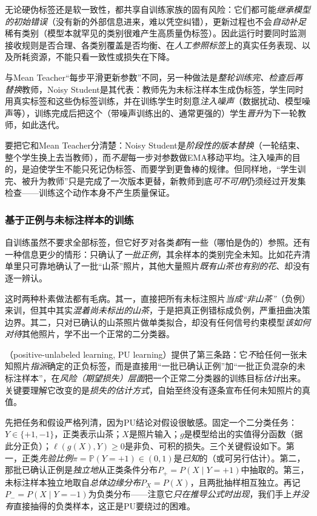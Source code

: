 无论硬伪标签还是软一致性，都共享自训练家族的固有风险：它们都可能\emph{继承模型的初始错误}（没有新的外部信息进来，难以凭空纠错），更新过程也不会\emph{自动补足}稀有类别（模型本就罕见的类别很难产生高质量伪标签）。因此运行时要同时监测接收规则是否合理、各类别覆盖是否均衡、在\emph{人工参照标签}上的真实任务表现、以及所耗资源，不能只看一致性或损失在下降。

与Mean Teacher“每步平滑更新参数”不同，另一种做法是\emph{整轮训练完、检查后再替换}教师，Noisy Student是其代表：教师先为未标注样本生成伪标签，学生同时用真实标签和这些伪标签训练，并在训练学生时刻意\emph{注入噪声}（数据扰动、模型噪声等），训练完成后把这个（带噪声训练出的、通常更强的）学生\emph{晋升}为下一轮教师，如此迭代。

要把它和Mean Teacher分清楚：Noisy Student是\emph{阶段性的版本替换}（一轮结束、整个学生换上去当教师），而\emph{不是}每一步对参数做EMA移动平均。注入噪声的目的，是迫使学生不能只死记伪标签、而要学到更鲁棒的规律。但同样地，“学生训完、被升为教师”只是完成了一次版本更替，新教师到底\emph{可不可用}仍须经过开发集检查——训练这个动作本身不产生质量保证。

\FloatBarrier
\subsubsection{基于正例与未标注样本的训练}
\label{sec:ka-pu-learning}

自训练虽然不要求全部标签，但它好歹对各类\emph{都}有一些（哪怕是伪的）参照。还有一种信息更少的情形：只确认了\emph{一批正例}，其余样本的类别完全未知。比如花卉清单里只可靠地确认了一批“山茶”照片，其他大量照片\emph{既有山茶也有别的花}、却没有逐一辨认。

这时两种朴素做法都有毛病。其一，直接把所有未标注照片\emph{当成“非山茶”}（负例）来训，但其中其实\emph{混着尚未标出的山茶}，于是把真正例错标成负例，严重扭曲决策边界。其二，只对已确认的山茶照片做单类拟合，却没有任何信号约束模型\emph{该如何对待}其他照片，学不出一个正常的二分类器。

（positive-unlabeled learning, PU learning）提供了第三条路：它\emph{不}给任何一张未知照片\emph{指派}确定的正负标签，而是直接用“一批已确认正例”加“一批正负混杂的未标注样本”，在\emph{风险（期望损失）层面}把一个正常二分类器的训练目标\emph{估计}出来。关键要理解它改变的是\emph{损失的估计方式}，自始至终没有逐条宣布任何未知照片的真值。

先把任务和假设严格列清，因为PU结论对假设很敏感。固定一个二分类任务：$Y\in\{+1,-1\}$，正类表示山茶；$X$是照片输入；$g$是模型给出的实值得分函数（据此分正负）；$\ell(g(X),Y)\geq0$是非负、可积的损失。三个关键假设如下。第一，正类\emph{先验比例}$\pi=\mathbb P(Y=+1)\in(0,1)$是\emph{已知}的（或可另行估计）。第二，那批已确认正例是\emph{独立地}从正类条件分布$P_+=P(X\mid Y=+1)$中抽取的。第三，未标注样本独立地取自\emph{总体边缘分布}$P_X=P(X)$，且两批抽样相互独立。再记$P_-=P(X\mid Y=-1)$为负类分布——注意它\emph{只在推导公式时出现}，我们手上\emph{并没有}直接抽得的负类样本，这正是PU要绕过的困难。

